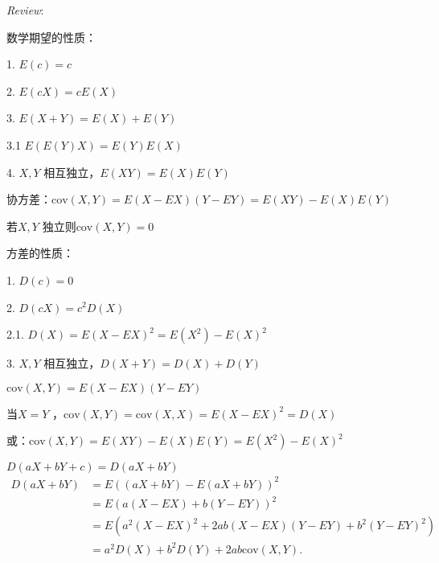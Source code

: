 \textit{Review}:
\begin{notation}
    数学期望的性质：
    
    1. $E\left( c \right) =c$ 
    
    2. $E\left( cX \right) =cE\left( X \right)$
    
    3. $E\left( X+Y \right) =E\left( X \right) +E\left( Y \right) $ 
    
    3.1 $E\left( E\left( Y \right) X \right) =E\left( Y \right) E\left( X \right) $ 
    
    4. $X,Y$ 相互独立，$E\left( XY \right) =E\left( X\right) E\left( Y \right) $
\end{notation}
协方差：$\text{cov}\left( X,Y \right) =E\left( X-EX \right) \left( Y-EY \right) =E\left( XY \right) -E\left( X \right) E\left( Y \right) $

若$X,Y$ 独立则$\text{cov}\left( X,Y \right) =0$ 
\begin{notation}
    方差的性质：
    
    1. $D\left( c \right) =0$ 
    
    2. $D\left( cX \right) =c^2D\left( X \right) $

    2.1. $D\left( X \right) = E\left( X-EX \right) ^2=E\left( X^2 \right) -E\left( X \right) ^2$

    3. $X,Y$ 相互独立，$D\left( X+Y \right) =D\left( X \right) +D\left( Y \right) $
\end{notation}
$\text{cov}\left( X,Y \right) =E\left( X-EX \right) \left( Y-EY \right) $ 

当$X=Y$ ，$\text{cov}\left( X,Y \right) =\text{cov}\left( X,X \right) =E\left( X-EX \right) ^2=D\left( X \right) $

或：$\text{cov}\left( X,Y \right) =E\left( XY \right) -E\left( X \right) E\left( Y \right) =E\left( X^2 \right) -E\left( X \right) ^2$

\begin{eg}
    $D\left( aX+bY+c \right) =D\left( aX+bY \right) $
    \begin{align*}
        D\left( aX+bY \right) &= E\left( \left( aX+bY \right) -E\left( aX+bY \right)  \right) ^2 \\
        &= E\left( a\left( X-EX \right) +b\left( Y-EY \right)  \right) ^2 \\
        &= E\left( a^2\left( X-EX \right) ^2 +2ab\left( X-EX \right)\left( Y-EY \right) +b^2\left( Y-EY \right) ^2 \right)  \\
        &= a^2D\left( X \right) +b^2D\left( Y \right) +2ab\text{cov}\left( X,Y \right)
    .\end{align*} 
\end{eg}


